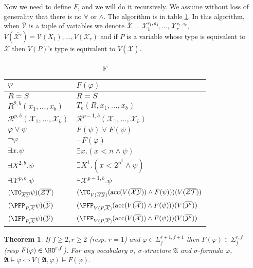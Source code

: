 \documentclass[a4paper,12pt]{article}
\newtheorem{theorem}{Theorem}[section]
\theoremstyle{definition}
\renewcommand{\phi}{\varphi}
\newcommand{\hod}[2]{\ensuremath{\HO^{#1,#2}}}
\newcommand{\hoc}[3]{\ensuremath{\Sigma^{#1,#3}_{#2}}}
\newcommand{\mc}{\mathcal}
\newcommand{\mf}{\mathfrak}
\newcommand{\ol}{\overline}
\newcommand{\olmc}[1]{\overline{\mathcal{#1}}}
\begin{document}
Now we need to define $F$, and we will do it recursively. We assume
without loss of generality that there is no $\forall$ or $\land$. The algorithm is in
table \ref{f}. In this algorithm, when $\olmc V$ is a tuple of
variables we denote $\olmc X=\mc X_{1}^{r_{1},a_{1}},\dots,\mc
X_{r}^{r_{r},a_{r}}$, $V(\olmc{X'})=\mc V(X_{1}),\dots,V(\mc X_{r})$
and if $P$ is a variable whose type is equivalent to $\olmc X$ then
$V(P)$'s type is equivalent to $V(\olmc{X})$.
\begin{table*}\label{f}
\begin{tabular}{|l|l|}
  \hline
  $\phi$&$F(\phi)$\\
  \hline
  $R=S$&$R=S$\\
  $R^{2,b}(x_{1},\dots,x_{b})$&$T_{b}(R,x_{1},\dots,x_{b})$\\
  $\mc R^{p,b}(\mc X_{1},\dots,\mc X_{b})$&$\mc R^{p-1,b}(\mc X_{1},\dots,\mc X_{b})$\\
  $\phi\lor\psi$& $F(\psi)\lor{}F(\psi)$\\
  $\neg\phi$&$\neg F(\phi)$\\
  $\exists{}x.\psi$&$\exists{}x.(x<{}n\land\psi)$\\
  $\exists{}X^{2,b}.\psi$&$\exists{}X^{1}.(x<{}2^{n^{b}}\land\psi)$\\
  $\exists{}\mc X^{p,b}.\psi$&$\exists{}\mc X^{p-1,b}.\psi$\\
  $(\TC_{\ol{\mc X}\ol{\mc Y}}\psi)(\ol{\mc Z}\ol{\mc T})$&$(\TC_{V(\ol{\mc X}\ol{\mc Y})}(\text{acc}(V(\olmc{XY}))\land F(\psi)))(V(\ol{\mc Z\mc T}))$\\
  $(\PFP_{P,\olmc X}\psi)(\olmc Y)$&$(\PFP_{V(P,\olmc{X})}(\text{acc}(V(\olmc X))\land F(\psi)))(V(\olmc{Y'}))$\\
  $(\IFP_{P,\olmc X}\psi)(\olmc Y)$&$(\IFP_{V(P,\olmc{X})}(\text{acc}(V(\olmc X))\land F(\psi)))(V(\olmc{Y'}))$\\
  \hline
\end{tabular}
\caption{F}
\end{table*}
\begin{theorem}
  If $f\ge2, r\ge2$ (resp. $r=1$) and $\phi\in\hoc {r+1}j{f+1}$ then
  $F(\phi)\in\hoc {r}j{f}$ (resp $F(\phi)\in\hod rf$).  For any
  vocabulary $\sigma$, $\sigma$-structure $\mf A$ and $\sigma$-formula
  $\phi$, $\mf A\models\phi\Leftrightarrow V(\mf A,\phi)\models
  F(\phi)$.
\end{theorem}
\end{document}
